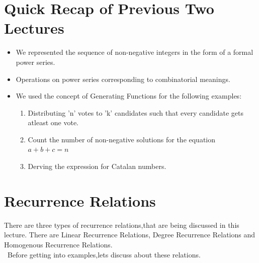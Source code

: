 \newcommand{\RN}[1]{%
  \textup{\uppercase\expandafter{\romannumeral#1}}%
}


\section{Quick Recap of Previous Two Lectures}
 
\begin{itemize}
	\item We represented the sequence of non-negative integers in the form of a formal power series.
	\item Operations on power series corresponding to combinatorial meanings.
	\item We used the concept of Generating Functions for the following examples:
		\begin{enumerate}
			\item Distributing 'n' votes to 'k' candidates such that every candidate gets atleast one vote.
			\item Count the number of non-negative solutions for the equation $a+b+c=n$
			\item Derving the expression for Catalan numbers.
		\end{enumerate}		 
\end{itemize}

\section{Recurrence Relations}

There are three types of recurrence relations,that are being discussed in this lecture. There are Linear Recurrence Relations, Degree Recurrence Relations and Homogenous Recurrence Relations.\\ \ Before getting into examples,lets discuss about these relations.

